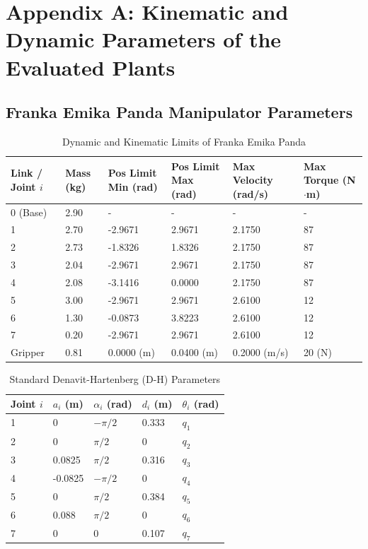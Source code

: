 \section{Appendix A: Kinematic and Dynamic Parameters of the Evaluated Plants}
\subsection{Franka Emika Panda Manipulator Parameters}
\begin{table}[H]
  \centering
  \renewcommand{\arraystretch}{1.5} %
  \caption{Dynamic and Kinematic Limits of Franka Emika Panda}
  \label{tab:franka_limits}
  \footnotesize
  \begin{tabular}{llllll}
    \toprule
    Link / Joint $i$ & Mass (kg) & Pos Limit Min (rad) & Pos Limit Max (rad) & Max Velocity (rad/s) & Max Torque (N$\cdot$m) \\
    \midrule
    0 (Base) & 2.90 & -       & -      & -      & -  \\
    1        & 2.70 & -2.9671 & 2.9671 & 2.1750 & 87 \\
    2        & 2.73 & -1.8326 & 1.8326 & 2.1750 & 87 \\
    3        & 2.04 & -2.9671 & 2.9671 & 2.1750 & 87 \\
    4        & 2.08 & -3.1416 & 0.0000 & 2.1750 & 87 \\
    5        & 3.00 & -2.9671 & 2.9671 & 2.6100 & 12 \\
    6        & 1.30 & -0.0873 & 3.8223 & 2.6100 & 12 \\
    7        & 0.20 & -2.9671 & 2.9671 & 2.6100 & 12 \\
    \addlinespace %
    Gripper  & 0.81 & 0.0000 (m) & 0.0400 (m) & 0.2000 (m/s) & 20 (N) \\
    \bottomrule
  \end{tabular}
\end{table}
\begin{table}[H]
  \centering
  \renewcommand{\arraystretch}{1.5} %
  \caption{Standard Denavit-Hartenberg (D-H) Parameters}
  \label{tab:dh_parameters}
  \footnotesize
  \begin{tabular}{lllll}
    \toprule
    Joint $i$ & $a_i$ (m) & $\alpha_i$ (rad) & $d_i$ (m) & $\theta_i$ (rad) \\
    \midrule
    1 & 0       & $-\pi/2$ & 0.333 & $q_1$ \\
    2 & 0       & $\pi/2$  & 0     & $q_2$ \\
    3 & 0.0825  & $\pi/2$  & 0.316 & $q_3$ \\
    4 & -0.0825 & $-\pi/2$ & 0     & $q_4$ \\
    5 & 0       & $\pi/2$  & 0.384 & $q_5$ \\
    6 & 0.088   & $\pi/2$  & 0     & $q_6$ \\
    7 & 0       & 0        & 0.107 & $q_7$ \\
    \bottomrule
  \end{tabular}
\end{table}
